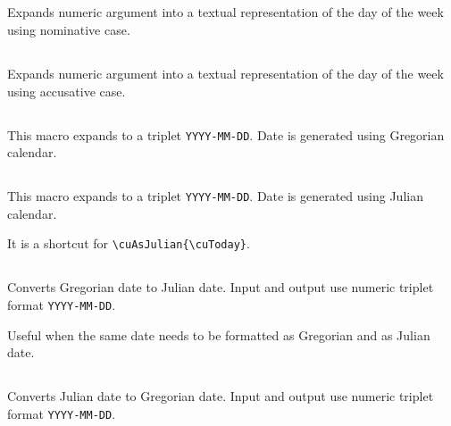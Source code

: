 \begin{EN}
\subsection{}
Expands numeric argument into a textual representation of the day of the week using nominative case.

\subsection{}
Expands numeric argument into a textual representation of the day of the week using accusative case.

\subsection{}
This macro expands to a triplet \texttt{YYYY-MM-DD}. Date is generated using Gregorian calendar.

\subsection{}
This macro expands to a triplet \texttt{YYYY-MM-DD}. Date is generated using Julian calendar.

It is a shortcut for \verb+\cuAsJulian{\cuToday}+.

\subsection{}
Converts Gregorian date to Julian date. Input and output use numeric triplet format \texttt{YYYY-MM-DD}.

Useful when the same date needs to be formatted as Gregorian and as Julian date.

\subsection{}
Converts Julian date to Gregorian date. Input and output use numeric triplet format \texttt{YYYY-MM-DD}.

\end{EN}

